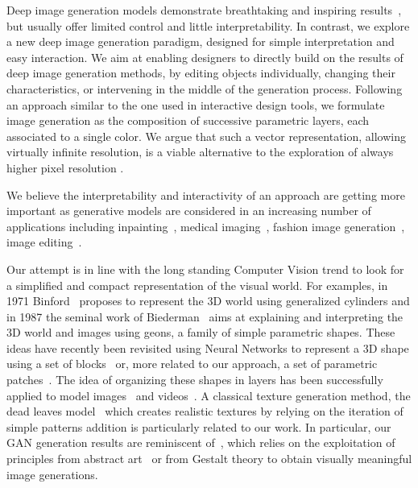\documentclass[10pt,twocolumn,letterpaper]{article}
\begin{document}
Deep image generation models demonstrate breathtaking and inspiring results~\cite{Zhu2017cycleGANs,Zhu2017bicycleGAN}, but usually offer limited control and little interpretability. In contrast, we explore a new deep image generation paradigm, designed for simple interpretation and easy interaction. 
We aim at enabling designers to directly build on the results of deep image generation methods, by editing objects individually, changing their characteristics, or intervening in the middle of the generation process.
Following an approach similar to the one used in interactive design tools, we formulate image generation as the composition of successive parametric layers, each associated to a single color.
We argue that such a vector representation, allowing virtually infinite resolution, is a viable alternative to the exploration of always higher pixel resolution \cite{karras2017progressive,brock2018large}.

We believe the interpretability and interactivity of an approach are getting more important as generative models are considered in an increasing number of applications including inpainting~\cite{Ulyanov2018deepPrior}, medical imaging~\cite{frid2018gan,nie2017medical}, fashion image generation~\cite{sbai2018design}, image editing~\cite{perarnau2016invertible}. 


Our attempt is in line with the long standing Computer Vision trend to look for a simplified and compact representation of the visual world. For examples, in 1971 Binford~\cite{binford1971visual} proposes to represent the 3D world using generalized cylinders and in 1987 the seminal work of Biederman~\cite{biederman1987recognition} aims at explaining and interpreting the 3D world and images using geons, a family of simple parametric shapes. These ideas have recently been revisited using Neural Networks to represent a 3D shape using a set of blocks~\cite{tulsiani2017learning} or, more related to our approach, a set of parametric patches~\cite{groueix2018atlasnet}. 
The idea of organizing these shapes in layers has been successfully applied to model images~\cite{adelson1991layered,SceneCollaging} and videos~\cite{wang1994representing}. 
A classical texture generation method, the dead leaves model~\cite{lee2001occlusion} which creates realistic textures by relying on the iteration of simple patterns addition is particularly related to our work. 
In particular, our GAN generation results are reminiscent of~\cite{alvarez2015exploring}, which relies on the exploitation of principles from abstract art~\cite{zheng2015layered} or from Gestalt theory to obtain visually meaningful image generations.
\end{document}
